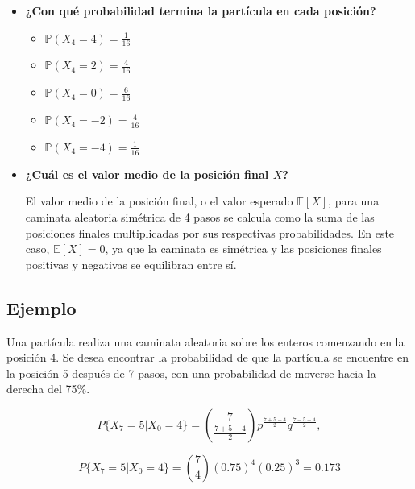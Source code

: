 \documentclass{article}
\begin{document}
\begin{itemize}
    \item \textbf{¿Con qué probabilidad termina la partícula en cada posición?}

          \begin{itemize}
              \item $\mathbb{P}(X_4 = 4) = \frac{1}{16}$
              \item $\mathbb{P}(X_4 = 2) = \frac{4}{16}$
              \item $\mathbb{P}(X_4 = 0) = \frac{6}{16}$
              \item $\mathbb{P}(X_4 = -2) = \frac{4}{16}$
              \item $\mathbb{P}(X_4 = -4) = \frac{1}{16}$
          \end{itemize}

    \item \textbf{¿Cuál es el valor medio de la posición final \( X \)?}

          El valor medio de la posición final, o el valor esperado \( \mathbb{E}[X] \), para una caminata aleatoria simétrica de 4 pasos se calcula como la suma de las posiciones finales multiplicadas por sus respectivas probabilidades. En este caso, \( \mathbb{E}[X] = 0 \), ya que la caminata es simétrica y las posiciones finales positivas y negativas se equilibran entre sí.
\end{itemize}

\subsection*{Ejemplo}

Una partícula realiza una caminata aleatoria sobre los enteros comenzando en la posición 4. Se desea encontrar la probabilidad de que la partícula se encuentre en la posición 5 después de 7 pasos, con una probabilidad de moverse hacia la derecha del 75\%.

\[
    P\{X_7 = 5 | X_0 = 4\} = \binom{7}{\frac{7 + 5 - 4}{2}} p^{\frac{7 + 5 - 4}{2}} q^{\frac{7 - 5 + 4}{2}},
\]

\[
    P\{X_7 = 5 | X_0 = 4\} = \binom{7}{4} (0.75)^{4} (0.25)^{3} = 0.173
\]
\end{document}
